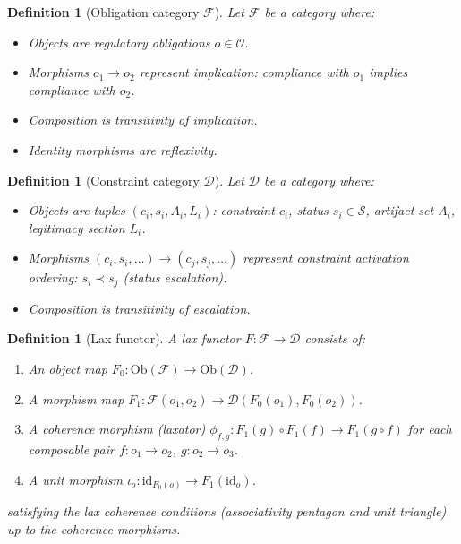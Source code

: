 \documentclass[11pt,letterpaper]{article}
\newtheorem{definition}[theorem]{Definition}
\theoremstyle{remark}
\begin{document}
\begin{definition}[Obligation category $\mathcal{F}$]
Let $\mathcal{F}$ be a category where:
\begin{itemize}
  \item Objects are regulatory obligations $o \in \mathcal{O}$.
  \item Morphisms $o_1 \to o_2$ represent implication: compliance
    with $o_1$ implies compliance with $o_2$.
  \item Composition is transitivity of implication.
  \item Identity morphisms are reflexivity.
\end{itemize}
\end{definition}

\begin{definition}[Constraint category $\mathcal{D}$]
Let $\mathcal{D}$ be a category where:
\begin{itemize}
  \item Objects are tuples $(c_i, s_i, A_i, L_i)$: constraint $c_i$,
    status $s_i \in \mathcal{S}$, artifact set $A_i$, legitimacy
    section $L_i$.
  \item Morphisms $(c_i, s_i, \ldots) \to (c_j, s_j, \ldots)$ represent
    constraint activation ordering: $s_i \prec s_j$ (status escalation).
  \item Composition is transitivity of escalation.
\end{itemize}
\end{definition}

\begin{definition}[Lax functor]
\label{def:A-lax}
A \emph{lax functor} $F : \mathcal{F} \to \mathcal{D}$ consists of:
\begin{enumerate}[label=(\alph*)]
  \item An object map $F_0 : \mathrm{Ob}(\mathcal{F}) \to \mathrm{Ob}(\mathcal{D})$.
  \item A morphism map $F_1 : \mathcal{F}(o_1, o_2) \to \mathcal{D}(F_0(o_1), F_0(o_2))$.
  \item A coherence morphism (laxator) $\phi_{f,g} : F_1(g) \circ F_1(f) \to F_1(g \circ f)$
    for each composable pair $f : o_1 \to o_2$, $g : o_2 \to o_3$.
  \item A unit morphism $\iota_o : \mathrm{id}_{F_0(o)} \to F_1(\mathrm{id}_o)$.
\end{enumerate}
satisfying the lax coherence conditions (associativity pentagon and
unit triangle) up to the coherence morphisms.
\end{definition}
\end{document}
